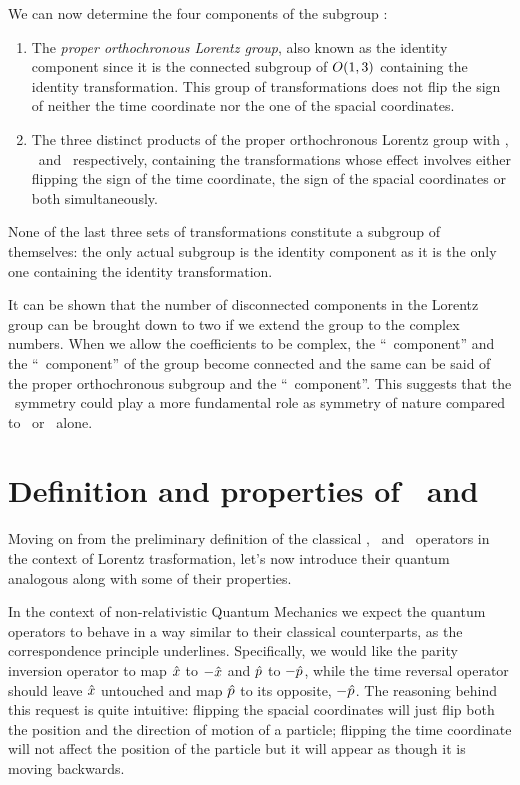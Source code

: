         We can now determine the four components of the subgroup \cite{bender2024}:
        \begin{enumerate}[label = \mybullet]
            \item The \emph{proper orthochronous Lorentz group}, also known as the identity component since it is the connected subgroup of $O\pqty{1,3}$ containing the identity transformation. This group of transformations does not flip the sign of neither the time coordinate nor the one of the spacial coordinates.
            \item The three distinct products of the proper orthochronous Lorentz group with \mcP, \mcT\ and \PT\ respectively, containing the transformations whose effect involves either flipping the sign of the time coordinate, the sign of the spacial coordinates or both simultaneously.
        \end{enumerate}
        None of the last three sets of transformations constitute a subgroup of themselves: the only actual subgroup is the identity component as it is the only one containing the identity transformation.
        
        It can be shown \cite{bender2024} that the number of disconnected components in the Lorentz group can be brought down to two if we extend the group to the complex numbers. When we allow the coefficients to be complex, the ``\mcP\ component'' and the ``\mcT\ component'' of the group become connected and the same can be said of the proper orthochronous subgroup and the ``\PT\ component''. This suggests that the \PT\ symmetry could play a more fundamental role as symmetry of nature compared to \mcP\ or \mcT\ alone.
    
    \section{Definition and properties of \hP\ and \hT}
        Moving on from the preliminary definition of the classical \mcP, \mcT\ and \PT\ operators in the context of Lorentz trasformation, let's now introduce their quantum analogous along with some of their properties.

        In the context of non-relativistic Quantum Mechanics we expect the quantum operators to behave in a way similar to their classical counterparts, as the correspondence principle underlines. Specifically, we would like the parity inversion operator to map $\hat{x}$ to $-\hat{x}$ and $\hat{p}$ to $-\hat{p}$, while the time reversal operator should leave $\hat{x}$ untouched and map $\hat{p}$ to its opposite, $-\hat{p}$. The reasoning behind this request is quite intuitive: flipping the spacial coordinates will just flip both the position and the direction of motion of a particle; flipping the time coordinate will not affect the position of the particle but it will appear as though it is moving backwards.

